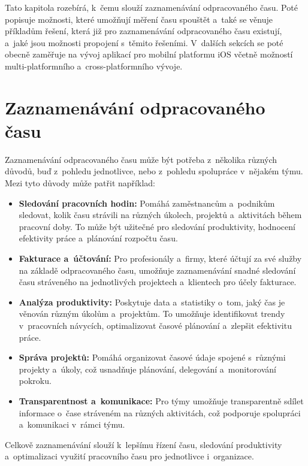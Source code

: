Tato kapitola rozebírá, k~čemu slouží zaznamenávání odpracovaného času. Poté popisuje možnosti, které umožňují měření času spouštět a~také se věnuje příkladům řešení, která již pro zaznamenávání odpracovaného času existují, a~jaké jsou možnosti propojení s~těmito řešeními. V~dalších sekcích se poté obecně zaměřuje na vývoj aplikací pro mobilní platformu iOS včetně možností multi-platformního a~cross-platformního vývoje.

\section{Zaznamenávání odpracovaného času}

Zaznamenávání odpracovaného času může být potřeba z~několika různých důvodů, buď z~pohledu jednotlivce, nebo z~pohledu spolupráce v~nějakém týmu. Mezi tyto důvody může patřit například:
\begin{itemize}
\item\textbf{Sledování pracovních hodin:} Pomáhá zaměstnancům a~podnikům sledovat, kolik času strávili na různých úkolech, projektů a~aktivitách během pracovní doby. To může být užitečné pro sledování produktivity, hodnocení efektivity práce a~plánování rozpočtu času.
\item\textbf{Fakturace a~účtování:} Pro profesionály a~firmy, které účtují za své služby na základě odpracovaného času, umožňuje zaznamenávání snadné sledování času stráveného na jednotlivých projektech a~klientech pro účely fakturace.
\item\textbf{Analýza produktivity:} Poskytuje data a~statistiky o~tom, jaký čas je věnován různým úkolům a~projektům. To umožňuje identifikovat trendy v~pracovních návycích, optimalizovat časové plánování a~zlepšit efektivitu práce.
\item\textbf{Správa projektů:} Pomáhá organizovat časové údaje spojené s~různými projekty a~úkoly, což usnadňuje plánování, delegování a~monitorování pokroku.
\item\textbf{Transparentnost a~komunikace:} Pro týmy umožňuje transparentně sdílet informace o~čase stráveném na různých aktivitách, což podporuje spolupráci a~komunikaci v~rámci týmu.
\end{itemize}

Celkově zaznamenávání slouží k~lepšímu řízení času, sledování produktivity a~optimalizaci využití pracovního času pro jednotlivce i~organizace.

